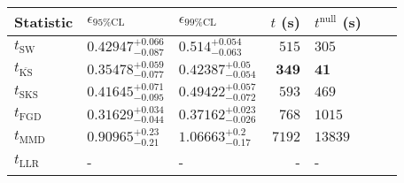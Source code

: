 \begin{tabular}{l|llr|llr}
	Statistic & $\epsilon_{95\%\mathrm{CL}}$ & $\epsilon_{99\%\mathrm{CL}}$ & $t$ (s) & $t^{\mathrm{null}}$ (s) \\
	\midrule
	$t_{\mathrm{SW}}$ & $0.42947_{-0.087}^{+0.066}$ & $0.514_{-0.063}^{+0.054}$ & $515$ & $305$ \\
	$t_{\overline{\mathrm{KS}}}$ & $0.35478_{-0.077}^{+0.059}$ & $0.42387_{-0.054}^{+0.05}$ & ${\mathbf{349}}$ & ${\mathbf{41}}$ \\
	$t_{\mathrm{SKS}}$ & $0.41645_{-0.095}^{+0.071}$ & $0.49422_{-0.072}^{+0.057}$ & $593$ & $469$ \\
	$t_{\mathrm{FGD}}$ & ${\mathbf{0.31629_{-0.044}^{+0.034}}}$ & ${\mathbf{0.37162_{-0.026}^{+0.023}}}$ & $768$ & $1015$ \\
	$t_{\mathrm{MMD}}$ & $0.90965_{-0.21}^{+0.23}$ & $1.06663_{-0.17}^{+0.2}$ & $7192$ & $13839$ \\
	$t_{\mathrm{LLR}}$ & - & - & - & - \\
	\bottomrule
\end{tabular}